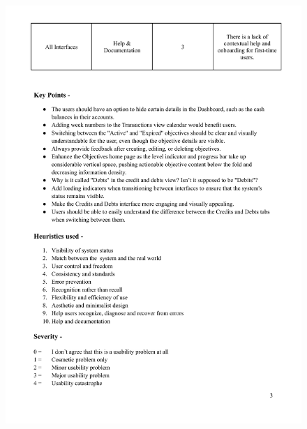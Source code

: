 \documentclass[a4paper,12pt]{article}
\begin{document}
\begin{figure}[H]
    \centering
    \includegraphics[width=1\linewidth]{HE3.pdf}
\end{figure}
\end{document}
